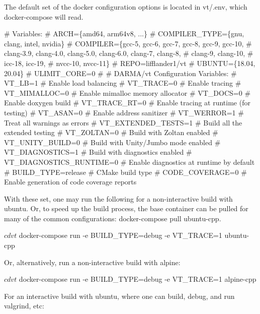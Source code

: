 The default set of the docker configuration options is located in {\ttfamily vt/.env}, which {\ttfamily docker-\/compose} will read.


\begin{DoxyCode}
# Variables:
#   ARCH=\{amd64, arm64v8, ...\}
#   COMPILER\_TYPE=\{gnu, clang, intel, nvidia\}
#   COMPILER=\{gcc-5, gcc-6, gcc-7, gcc-8, gcc-9, gcc-10,
#             clang-3.9, clang-4.0, clang-5.0, clang-6.0, clang-7, clang-8,
#             clang-9, clang-10,
#             icc-18, icc-19,
#             nvcc-10, nvcc-11\}
#   REPO=lifflander1/vt
#   UBUNTU=\{18.04, 20.04\}
#   ULIMIT\_CORE=0
#
# DARMA/vt Configuration Variables:
#   VT\_LB=1                   # Enable load balancing
#   VT\_TRACE=0                # Enable tracing
#   VT\_MIMALLOC=0             # Enable mimalloc memory allocator
#   VT\_DOCS=0                 # Enable doxygen build
#   VT\_TRACE\_RT=0             # Enable tracing at runtime (for testing)
#   VT\_ASAN=0                 # Enable address sanitizer
#   VT\_WERROR=1               # Treat all warnings as errors
#   VT\_EXTENDED\_TESTS=1       # Build all the extended testing
#   VT\_ZOLTAN=0               # Build with Zoltan enabled
#   VT\_UNITY\_BUILD=0          # Build with Unity/Jumbo mode enabled
#   VT\_DIAGNOSTICS=1          # Build with diagnostics enabled
#   VT\_DIAGNOSTICS\_RUNTIME=0  # Enable diagnostics at runtime by default
#   BUILD\_TYPE=release        # CMake build type
#   CODE\_COVERAGE=0           # Enable generation of code coverage reports
\end{DoxyCode}


With these set, one may run the following for a non-\/interactive build with ubuntu. Or, to speed up the build process, the base container can be pulled for many of the common configurations\+: {\ttfamily docker-\/compose pull ubuntu-\/cpp}.


\begin{DoxyCode}
$ cd vt
$ docker-compose run -e BUILD\_TYPE=debug -e VT\_TRACE=1 ubuntu-cpp
\end{DoxyCode}


Or, alternatively, run a non-\/interactive build with alpine\+:


\begin{DoxyCode}
$ cd vt
$ docker-compose run -e BUILD\_TYPE=debug -e VT\_TRACE=1 alpine-cpp
\end{DoxyCode}


For an interactive build with ubuntu, where one can build, debug, and run {\ttfamily valgrind}, etc\+:


